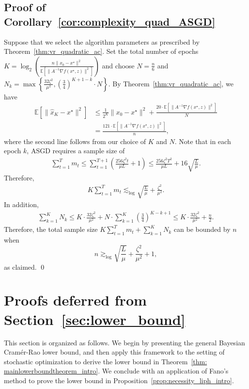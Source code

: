 \documentclass[11pt,twoside]{article}
\numberwithin{equation}{section}
\newcommand{\EE}{\mathbb{E}}
\newcommand{\1}{\mathbf{1}}
\newcommand{\paren}[1]{ \left( #1 \right) }
\theoremstyle{remark}
\theoremstyle{plain}
\begin{document}
\subsection{Proof of Corollary~\ref{cor:complexity_quad_ASGD}}\label{appendix:complexity_quad_ASGD}
Suppose that we select the algorithm parameters as prescribed by Theorem~\ref{thm:vr_quadratic_ac}.  Set 	the total number of epochs $K = \log_2\paren{\frac{n \|x_0-x^\star\|^2}{ \EE[\|A^{-1} \nabla f(x^\star, z)\|^2]}}$ and choose  $N = \frac{n}{6}$ and $N_k = \max \left\{\frac{32\zeta^2}{\mu^2}, \left(\frac{3}{4}\right)^{K+1-k} \cdot N \right\}.$ 
By Theorem~\ref{thm:vr_quadratic_ac}, we have
\begin{align*}
	\EE[\|\widehat x_K - x^\star\|^2] &\le \frac{1}{2^K} \|x_0 - x^\star\|^2 + \frac{20\cdot  \EE[\|A^{-1} \nabla f(x^\star, z)\|^2]}{N} \\
	&= \frac{121\cdot  \EE[\|A^{-1} \nabla f(x^\star, z)\|^2]}{n},
\end{align*}
where the second line follows from our choice of $K$ and $N$.  Note that in each epoch $k$, ASGD requires a sample size of
\begin{align*}
\sum_{t=1}^T m_t  \le  \sum_{t=1}^{T+1}  \left(\frac{256\zeta^2 t}{\mu L} + 1 \right) \le \frac{256 \zeta^2  T^2}{\mu L} + 16 \sqrt{\frac{L}{ \mu}}.
\end{align*}
Therefore, 
\begin{align*}
K \sum_{t=1}^T m_t \lesssim_{\log} \sqrt{\frac{L}{\mu}} + \frac{\zeta^2}{\mu^2}.
\end{align*}
In addition, 
\begin{align*}
\sum_{k=1}^{K} N_k \le  K\cdot \frac{32\zeta^2}{\mu^2} + N \cdot \sum_{k=1}^{K} \left(\frac{3}{4}\right)^{K-k+1} \le K\cdot \frac{32\zeta^2}{\mu^2}  + \frac{n}{2}.
\end{align*}
Therefore, the total sample size $	K \sum_{t=1}^T m_t + \sum_{k=1}^K N_k$ can be bounded by $n$ when 
$$n \gtrsim_{\log} \sqrt{\frac{L}{\mu}} + \frac{\zeta^2}{\mu^2} + 1,$$
as claimed.
\qed

\section{Proofs deferred from Section~\ref{sec:lower_bound}}\label{sec:lower_bound_proof}
This section is organized as follows. We begin by presenting the general Bayesian Cram\'{e}r-Rao lower bound, and then apply this framework to the setting of stochastic optimization to derive the lower bound in Theorem~\ref{thm: mainlowerboundtheorem_intro}. We conclude with an application of Fano's method to prove the lower bound in Proposition~\ref{prop:necessity_liph_intro}.
\end{document}
